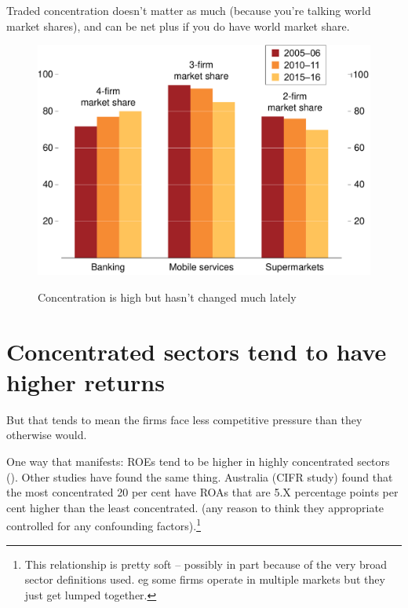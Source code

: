 Traded concentration doesn't matter as much (because you're talking world market shares), and can be net plus if you do have world market share.

\begin{figure}[p] 
 \caption{Concentration is high but hasn't changed much lately}
 \includegraphics[page=1]{atlas/Change_in_market_share}\label{fig:concentration}
\end{figure}

\section{Concentrated sectors tend to have higher returns}

But that tends to mean the firms face less competitive pressure than they otherwise would.

One way that manifests: ROEs tend to be higher in highly concentrated sectors (). Other studies have found the same thing.  Australia (CIFR study) found that the most concentrated 20 per cent have ROAs that are 5.X percentage points per cent higher than the least concentrated. (any reason to think they appropriate controlled for any confounding factors).\footnote{This relationship is pretty soft -- possibly in part because of the very broad sector definitions used. eg some firms operate in multiple markets but they just get lumped together.}  


